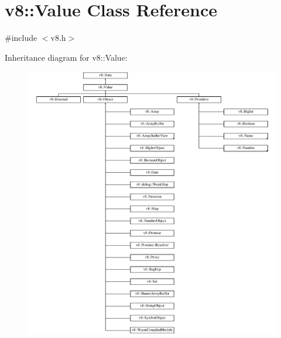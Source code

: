 \hypertarget{classv8_1_1Value}{\section{v8\-:\-:Value Class Reference}
\label{classv8_1_1Value}
}


{\ttfamily \#include $<$v8.\-h$>$}

Inheritance diagram for v8\-:\-:Value\-:\begin{figure}[H]
\begin{center}
\leavevmode
\includegraphics[height=11.914893cm]{classv8_1_1Value}
\end{center}
\end{figure}
